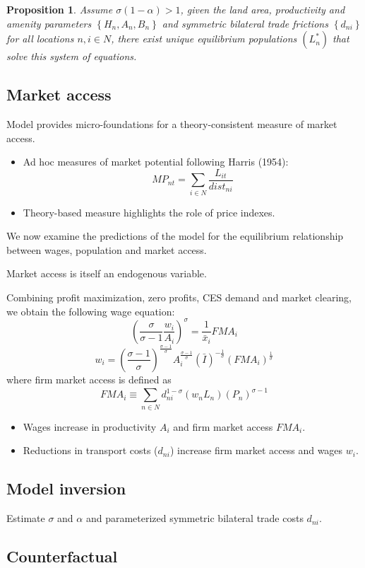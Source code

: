 \documentclass[11pt,a4paper]{article}
\newtheorem{pros}{Proposition}
\begin{document}
\begin{pros}
Assume $\sigma (1-\alpha )>1$, given the land area, productivity and amenity parameters $\left\{ H_n,A_n,B_n \right\}$ and symmetric bilateral trade frictions $\left\{ d_{ni} \right\}$ for all locations $n,i \in N$, there exist unique equilibrium populations $(L_n^*)$ that solve this system of equations. 
\end{pros}

\subsection{Market access}
Model provides micro-foundations for a theory-consistent measure of market access. 
\begin{itemize}
  \item Ad hoc measures of market potential following Harris (1954): $$ MP _{nt} = \sum_{i \in N}^{} \frac{L_{it}}{dist_{ni}} $$ 
  \item Theory-based measure highlights the role of price indexes. 
\end{itemize}
We now examine the predictions of the model for the equilibrium relationship between wages, population and market access. 

Market access is itself an endogenous variable. 

Combining profit maximization, zero profits, CES demand and market clearing, we obtain the following wage equation:
$$ \left( \frac{\sigma }{\sigma -1} \frac{w_i}{A_i}\right)^\sigma = \frac{1}{\bar{x}_i} FMA_i $$
\begin{equation}
  w_i = \left( \frac{\sigma -1}{\sigma } \right)^{\frac{\sigma -1}{\sigma }} A_i^{\frac{\sigma -1}{\sigma }} (\bar{I})^{-\frac{1}{\sigma }} (FMA_i)^{\frac{1}{\sigma }}
\end{equation}
where firm market access is defined as $$ FMA_i \equiv \sum_{n \in N}^{} d_{ni}^{1-\sigma } (w_n L_n)(P_n)^{\sigma -1} $$
\begin{itemize}
  \item Wages increase in productivity $A_i$ and firm market access $FMA_i$. 
  \item Reductions in transport costs ($d_{ni}$) increase firm market access and wages $w_i$. 
\end{itemize}


\subsection{Model inversion}
Estimate $\sigma $ and $\alpha $ and parameterized symmetric bilateral trade costs $d_{ni}$. 


\subsection{Counterfactual}
\end{document}
